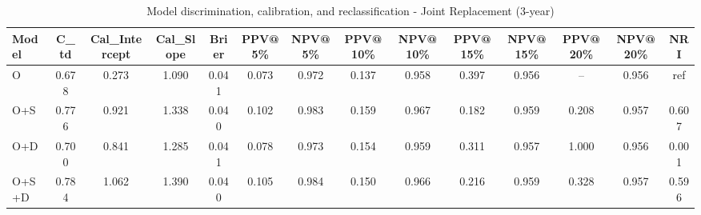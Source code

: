 \begin{table}[htbp]
\centering
\small
\caption{Model discrimination, calibration, and reclassification - Joint Replacement (3-year)}
\label{tab:perf_joint_3y}
\begin{tabular}{lccccccccccccc}
\toprule
Model & C\_td & Cal\_Intercept & Cal\_Slope & Brier & PPV@5\% & NPV@5\% & PPV@10\% & NPV@10\% & PPV@15\% & NPV@15\% & PPV@20\% & NPV@20\% & NRI \\
\midrule
O & 0.678 & 0.273 & 1.090 & 0.041 & 0.073 & 0.972 & 0.137 & 0.958 & 0.397 & 0.956 & -- & 0.956 & ref \\
O+S & 0.776 & 0.921 & 1.338 & 0.040 & 0.102 & 0.983 & 0.159 & 0.967 & 0.182 & 0.959 & 0.208 & 0.957 & 0.607 \\
O+D & 0.700 & 0.841 & 1.285 & 0.041 & 0.078 & 0.973 & 0.154 & 0.959 & 0.311 & 0.957 & 1.000 & 0.956 & 0.001 \\
O+S+D & 0.784 & 1.062 & 1.390 & 0.040 & 0.105 & 0.984 & 0.150 & 0.966 & 0.216 & 0.959 & 0.328 & 0.957 & 0.596 \\
\bottomrule
\end{tabular}
\end{table}